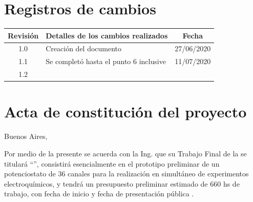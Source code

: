 \documentclass[11pt]{charter}
\begin{document}
\maketitle
\thispagestyle{empty}
\pagebreak


\thispagestyle{empty}
{\setlength{\parskip}{0pt}
\tableofcontents{}
}
\pagebreak


\section{Registros de cambios}
\label{sec:registro}


\begin{table}[ht]
\label{tab:registro}
\centering

\begin{tabularx}{\linewidth}{@{}|c|X|c|@{}}
\hline
\rowcolor[HTML]{C0C0C0} 
Revisión & \multicolumn{1}{c|}{\cellcolor[HTML]{C0C0C0}Detalles de los cambios realizados} & Fecha      \\ \hline
1.0      & Creación del documento     & 27/06/2020 \\ \hline
1.1      & Se completó hasta el punto 6 inclusive  & 11/07/2020  \\ \hline
1.2      &                   & \\ \hline
\end{tabularx}
\end{table}

\pagebreak



\section{Acta de constitución del proyecto}
\label{sec:acta}

\begin{flushright}
Buenos Aires, \fechaInicioName
\end{flushright}

\vspace{2cm}

Por medio de la presente se acuerda con la Ing. \authorname\hspace{1px} que su Trabajo Final de la \degreename\hspace{1px} se titulará ``\ttitle'', consistirá esencialmente en el prototipo preliminar de un potenciostato de 36 canales para la realización en simultáneo de experimentos electroquímicos, y tendrá un presupuesto preliminar estimado de 660 hs de trabajo, con fecha de inicio \fechaInicioName\hspace{1px} y fecha de presentación pública \fechaFinalName.
\end{document}
